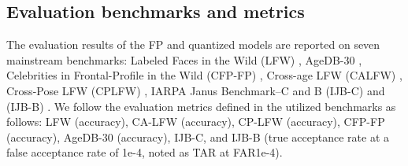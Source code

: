 \documentclass[a4paper,conference]{IEEEtran}
\begin{document}
\vspace{-1mm}
\subsection{Evaluation benchmarks and metrics} 
\vspace{-1mm}
The evaluation results of the FP and quantized models are reported on seven mainstream benchmarks: Labeled Faces in the Wild (LFW) \cite{LFWTech}, AgeDB-30 \cite{agedb}, Celebrities in Frontal-Profile in the Wild (CFP-FP) \cite{cfp-fp}, Cross-age LFW (CALFW) \cite{CALFW},  Cross-Pose LFW (CPLFW)  \cite{CPLFWTech}, IARPA Janus Benchmark–C and B (IJB-C) \cite{ijbc} and (IJB-B) \cite{DBLP:conf/cvpr/WhitelamTBMAMKJ17}. 
We follow the evaluation metrics defined in the utilized benchmarks as follows: LFW (accuracy), CA-LFW (accuracy), CP-LFW (accuracy), CFP-FP (accuracy), AgeDB-30 (accuracy),  IJB-C, and IJB-B (true acceptance rate at a false acceptance rate of 1e-4, noted as TAR at FAR1e-4).
\end{document}
